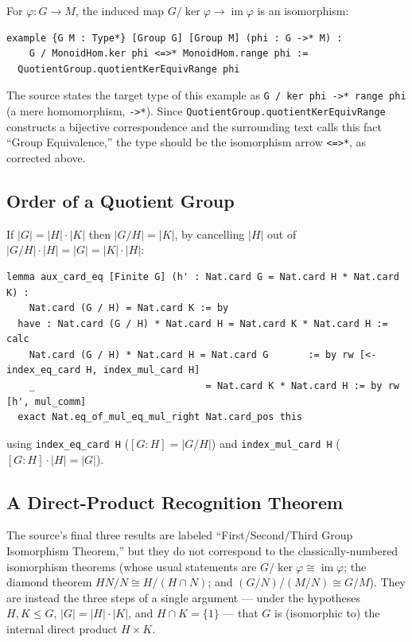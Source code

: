 \documentclass[11pt]{article}
\begin{document}
For $\varphi:G\to M$, the induced map $G/\ker\varphi \to \operatorname{im}\varphi$ is an isomorphism:

\begin{lstlisting}
example {G M : Type*} [Group G] [Group M] (phi : G ->* M) :
    G / MonoidHom.ker phi <=>* MonoidHom.range phi :=
  QuotientGroup.quotientKerEquivRange phi
\end{lstlisting}

\begin{auditnote}
The source states the target type of this example as \verb|G / ker phi ->* range phi| (a mere homomorphism, \verb|->*|). Since \verb|QuotientGroup.quotientKerEquivRange| constructs a bijective correspondence and the surrounding text calls this fact ``Group Equivalence,'' the type should be the isomorphism arrow \verb|<=>*|, as corrected above.
\end{auditnote}

\subsection{Order of a Quotient Group}

If $|G|=|H|\cdot|K|$ then $|G/H|=|K|$, by cancelling $|H|$ out of $|G/H|\cdot|H| = |G| = |K|\cdot|H|$:

\begin{lstlisting}
lemma aux_card_eq [Finite G] (h' : Nat.card G = Nat.card H * Nat.card K) :
    Nat.card (G / H) = Nat.card K := by
  have : Nat.card (G / H) * Nat.card H = Nat.card K * Nat.card H := calc
    Nat.card (G / H) * Nat.card H = Nat.card G       := by rw [<- index_eq_card H, index_mul_card H]
    _                              = Nat.card K * Nat.card H := by rw [h', mul_comm]
  exact Nat.eq_of_mul_eq_mul_right Nat.card_pos this
\end{lstlisting}
using \verb|index_eq_card H| ($[G:H]=|G/H|$) and \verb|index_mul_card H| ($[G:H]\cdot|H|=|G|$).

\subsection{A Direct-Product Recognition Theorem}

The source's final three results are labeled ``First/Second/Third Group Isomorphism Theorem,'' but they do not correspond to the classically-numbered isomorphism theorems (whose usual statements are $G/\ker\varphi\cong\operatorname{im}\varphi$; the diamond theorem $HN/N\cong H/(H\cap N)$; and $(G/N)/(M/N)\cong G/M$). They are instead the three steps of a single argument --- under the hypotheses $H,K\le G$, $|G|=|H|\cdot|K|$, and $H\cap K=\{1\}$ --- that $G$ is (isomorphic to) the internal direct product $H\times K$.
\end{document}
